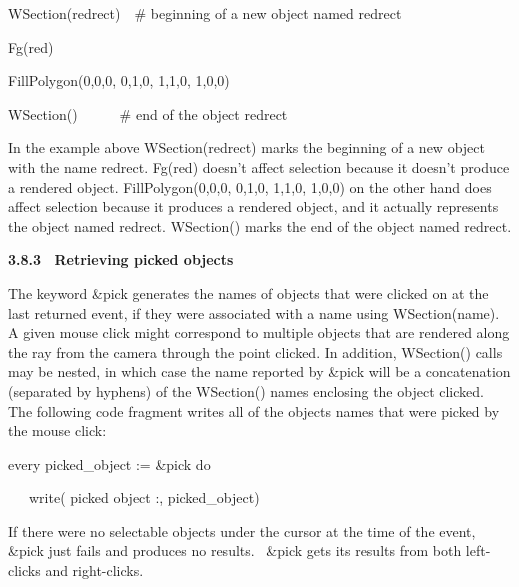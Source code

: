 \documentclass[letterpaper]{article}
\begin{document}
\bigskip

{\sffamily
WSection({\textquotedbl}redrect{\textquotedbl})\ \ \# beginning of a new object named redrect}

{\sffamily
Fg({\textquotedbl}red{\textquotedbl}) \ \ }

{\sffamily
FillPolygon(0,0,0, 0,1,0, 1,1,0, 1,0,0)}

{\sffamily
WSection()\ \ \ \ \ \ \# end of the object redrect}


\bigskip

{
In the example above \textsf{WSection({\textquotedbl}redrect{\textquotedbl})} marks the beginning of a new object with
the name redrect. \textsf{Fg({\textquotedbl}red{\textquotedbl}) }doesn't affect selection because it doesn't produce a
rendered object. \textsf{FillPolygon(0,0,0, 0,1,0, 1,1,0, 1,0,0) }on the other hand does affect selection because it
produces a rendered object, and it actually represents the object named redrect. \textsf{WSection() }marks the end of
the object named redrect.}


\bigskip

{\bfseries
3.8.3 \ Retrieving picked objects}


\bigskip

{
The keyword \textsf{\&pick} generates the names of objects that were clicked on at the last returned event, if they were
associated with a name using \textsf{WSection(name)}. A given mouse click might correspond to multiple objects that are
rendered along the ray from the camera through the point clicked. In addition, \textsf{WSection()} calls may be nested,
in which case the name reported by \textsf{\&pick} will be a concatenation (separated by hyphens) of the
\textsf{WSection()} names enclosing the object clicked. The following code fragment writes all of the objects names
that were picked by the mouse click:}


\bigskip

{\sffamily
every picked\_object := \&pick do}

{\sffamily
\ \ \ write({\textquotedbl} picked object :{\textquotedbl}, picked\_object)}


\bigskip

{
If there were no selectable objects under the cursor at the time of the event, \textsf{\&pick} just fails and produces
no results. \ \textsf{\&pick} gets its results from both left-clicks and right-clicks.}
\end{document}
